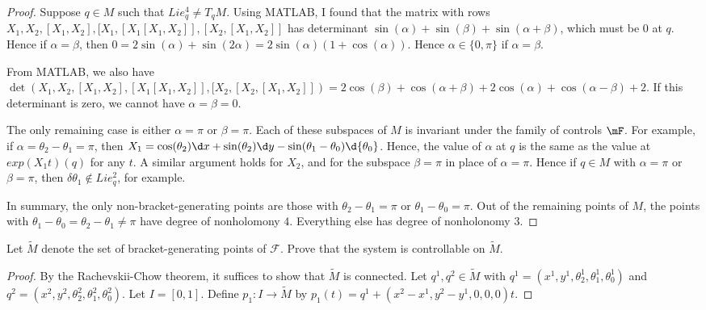 \documentclass{article}
\begin{document}
\begin{proof}
Suppose $q \in M$ such that $Lie^4_q \neq T_qM$. Using MATLAB, I found that the matrix with rows $X_1, X_2, [X_1, X_2], [X_1, [X_1 [X_1, X_2]], [X_2, [X_1, X_2]]$ has determinant $\sin(\alpha) + \sin(\beta) + \sin(\alpha + \beta)$, which must be $0$ at $q$.  Hence if $\alpha = \beta$, then $0 = 2\sin(\alpha) + \sin(2 \alpha) = 2 \sin(\alpha) (1 + \cos(\alpha))$. Hence $\alpha \in \{0, \pi\}$ if $\alpha = \beta$. 

From MATLAB, we also have $\det(X_1, X_2, [X_1, X_2], [X_1 [X_1, X_2]], [X_2, [X_2, [X_1, X_2]]) = 2 \cos(\beta) + \cos(\alpha + \beta) + 2 \cos(\alpha) + \cos(\alpha - \beta) + 2$. If this determinant is zero, we cannot have $\alpha = \beta = 0$.  

The only remaining case is either $\alpha = \pi$ or $\beta = \pi$. Each of these subspaces of $M$ is invariant under the family of controls $\mF$.  For example, if $\alpha = \theta_2 - \theta_1 = \pi$, then $X_1 = \cos(\theta_2) \d x + \sin(\theta_2) \d y - \sin(\theta_1 - \theta_0) \d {\theta_0}$. Hence, the value of $\alpha$ at $q$ is the same as the value at $exp(X_1t)(q)$ for any $t$.  A similar argument holds for $X_2$, and for the subspace $\beta = \pi$ in place of $\alpha = \pi$.   Hence if $q \in M$ with $\alpha = \pi$ or $\beta = \pi$, then $\delta {\theta_1} \not\in Lie_q^2$, for example.

In summary, the only non-bracket-generating points are those with $\theta_2 - \theta_1 = \pi$ or $\theta_1 - \theta_0 = \pi$.  Out of the remaining points of $M$, the points with $\theta_1 - \theta_0 = \theta_2 - \theta_1 \neq \pi$ have degree of nonholomony $4$.  Everything else has degree of nonholonomy $3$.

\end{proof}


 Let $\widetilde M$ denote the set of bracket-generating points of $\mathcal F$. Prove that the system is controllable on $\widetilde M$.

\begin{proof}
By the Rachevskii-Chow theorem, it suffices to show that $\widetilde M$ is connected.  Let $q^1, q^2 \in \widetilde M$ with $q^1 = (x^1, y^1, \theta_2^1, \theta_1^1, \theta_0^1)$ and $q^2 = (x^2, y^2, \theta_2^2, \theta_1^2, \theta_0^2)$.  Let $I = [0,1]$. Define $p_1:I \to \widetilde M$ by $p_1(t) = q^1 + (x^2 - x^1 , y^2 - y^1, 0 ,0 ,0)t$.  

\end{proof}
\end{document}
